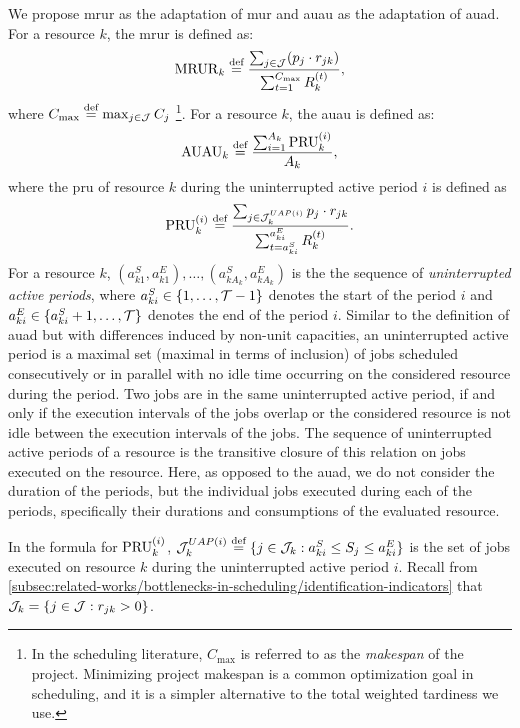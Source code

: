We propose \acf{mrur} as the adaptation of \ac{mur} and \acf{auau} as the adaptation of \ac{auad}.
For a resource $k$, the \ac{mrur} is defined as:
$$
\indMRUR{k} \defeq \frac{\sum_{j \in \Jobs} (\duration{j} \cdot \consumption{j}{k})}%
                        {\sum_{t=1}^{C_{\max}} \capacity{k}{t}},
$$
where $C_{\max} \overset{\text{def}}{=} \max_{j \in \mathcal{J}} C_{j}$%
\footnote{In the scheduling literature,
$C_{\max}$ is referred to as the \emph{makespan} of the project.
Minimizing project makespan is a common optimization goal in scheduling,
and it is a simpler alternative to the total weighted tardiness we use.}.
For a resource $k$, the \ac{auau} is defined as:
$$
\indAUAU{k} \defeq \frac{\sum_{i=1}^{A_k} \indPRU{k}{i}}%
                        {A_k},
$$
where the \acf{pru} of resource $k$ during the uninterrupted active period $i$
is defined as
$$
\indPRU{k}{i} \defeq \frac{\sum_{j \in \JobsOnResourceInPeriod{k}{i}}
                                \duration{j} \cdot \consumption{j}{k}}%
                          {\sum_{t=a_{ki}^{S}}^{a_{ki}^{E}} \capacity{k}{t} }.
$$
For a resource $k$,
$(a_{k1}^{S}, a_{k1}^{E}), \dots, (a_{kA_k}^{S}, a_{kA_k}^{E})$
is the the sequence of \emph{uninterrupted active periods},
where $a_{ki}^{S} \in \{{1}, \dots, {\mathcal{T}-1}\}$ denotes the start of the period $i$
and $a_{ki}^{E} \in \{{a_{ki}^{S}+1}, \dots, {\mathcal{T}}\}$ denotes the end of the period $i$.
Similar to the definition of \ac{auad} but with differences induced by non-unit capacities,
an uninterrupted active period is a maximal set (maximal in terms of inclusion)
of jobs scheduled consecutively or in parallel with no idle time
occurring on the considered resource during the period.
Two jobs are in the same uninterrupted active period, if and only if
the execution intervals of the jobs overlap
or the considered resource is not idle between the execution intervals of the jobs.
The sequence of uninterrupted active periods of a resource is the transitive closure of this relation
on jobs executed on the resource.
Here, as opposed to the \ac{auad},
we do not consider the duration of the periods,
but the individual jobs executed during each of the periods,
specifically their durations and consumptions of the evaluated resource.

In the formula for $\operatorname{PRU}_{k}^{(i)}$,
$\mathcal{J}_{k}^{UAP(i)} \overset{\text{def}}{=} \{ j \in \mathcal{J}_{k} : a_{ki}^{S} \leq S_{j} \leq a_{ki}^{E} \}$
is the set of jobs executed on resource $k$ during the uninterrupted active period $i$.
Recall from \cref{subsec:related-works/bottlenecks-in-scheduling/identification-indicators} that
$\mathcal{J}_{k} = \{ j \in \mathcal{J} : r_{j k} > 0 \}$.

